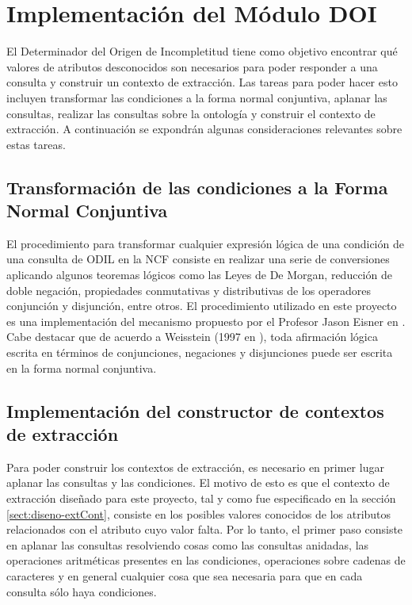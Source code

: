 \section{Implementación del Módulo DOI}\label{sect:implementacion-DOI}

El Determinador del Origen de Incompletitud tiene como objetivo encontrar qué valores de atributos desconocidos son necesarios para poder responder a una consulta y construir un contexto de extracción. Las tareas para poder hacer esto incluyen transformar las condiciones a la forma normal conjuntiva, aplanar las consultas, realizar las consultas sobre la ontología y construir el contexto de extracción. A continuación se expondrán algunas consideraciones relevantes sobre estas tareas. \\ 

\subsection{Transformación de las condiciones a la Forma Normal Conjuntiva}

El procedimiento para transformar cualquier expresión lógica de una condición de una consulta de ODIL en la NCF consiste en realizar una serie de conversiones aplicando algunos teoremas lógicos como las Leyes de De Morgan, reducción de doble negación, propiedades conmutativas y distributivas de los operadores conjunción y disjunción, entre otros. El procedimiento utilizado en este proyecto es una implementación del mecanismo propuesto por el Profesor Jason Eisner en \cite{normalConjunctiveFormImplementation}. Cabe destacar que de acuerdo a Weisstein (1997 en \cite{normalConjunctiveForm}), toda afirmación lógica escrita en términos de conjunciones, negaciones y disjunciones puede ser escrita en la forma normal conjuntiva. \\

\subsection{Implementación del constructor de contextos de extracción}

Para poder construir los contextos de extracción, es necesario en primer lugar aplanar las consultas y las condiciones. El motivo de esto es que el contexto de extracción diseñado para este proyecto, tal y como fue especificado en la sección \ref{sect:diseno-extCont}, consiste en los posibles valores conocidos de los atributos relacionados con el atributo cuyo valor falta. Por lo tanto, el primer paso consiste en aplanar las consultas resolviendo cosas como las consultas anidadas, las operaciones aritméticas presentes en las condiciones, operaciones sobre cadenas de caracteres y en general cualquier cosa que sea necesaria para que en cada consulta sólo haya condiciones. \\

